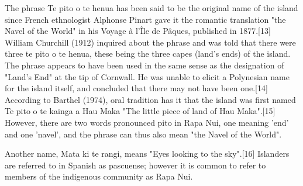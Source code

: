 The phrase Te pito o te henua has been said to be the original name of the island since French ethnologist Alphonse Pinart gave it the romantic translation "the Navel of the World" in his Voyage à l'Île de Pâques, published in 1877.[13] William Churchill (1912) inquired about the phrase and was told that there were three te pito o te henua, these being the three capes (land's ends) of the island. The phrase appears to have been used in the same sense as the designation of "Land's End" at the tip of Cornwall. He was unable to elicit a Polynesian name for the island itself, and concluded that there may not have been one.[14]
According to Barthel (1974), oral tradition has it that the island was first named Te pito o te kainga a Hau Maka "The little piece of land of Hau Maka".[15] However, there are two words pronounced pito in Rapa Nui, one meaning 'end' and one 'navel', and the phrase can thus also mean "the Navel of the World". 

Another name, Mata ki te rangi, means "Eyes looking to the sky".[16]
Islanders are referred to in Spanish as pascuense; however it is common to refer to members of the indigenous community as Rapa Nui.
